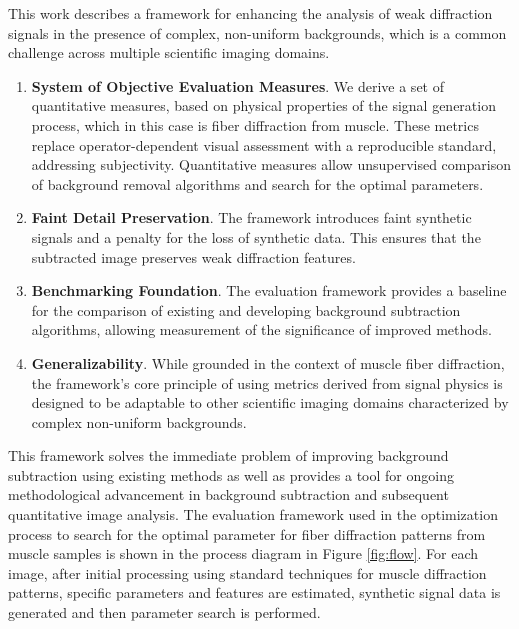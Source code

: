 \documentclass[iucr,review]{iucrjournals}
\begin{document}
This work describes a framework for enhancing the analysis of weak diffraction signals in the presence of complex, non-uniform backgrounds, 
which is a common challenge across multiple scientific imaging domains. 
\begin{enumerate}
        \item \textbf{System of Objective Evaluation Measures}. We derive a set of quantitative measures,
        based on physical properties of the signal generation process, which in this case is fiber diffraction from muscle.
        These metrics replace operator-dependent visual assessment with a reproducible standard,
        addressing subjectivity.
        Quantitative measures allow unsupervised
        comparison of background removal algorithms and search for the optimal parameters. 
        \item \textbf{Faint Detail Preservation}. The framework introduces faint synthetic signals and a penalty for the loss
        of synthetic data. This ensures that the subtracted image preserves weak diffraction features.
        \item \textbf{Benchmarking Foundation}. The evaluation framework provides a baseline for the comparison
        of existing and developing background subtraction algorithms, allowing measurement of the significance of improved methods. 
        \item \textbf{Generalizability}. While grounded in the context of muscle fiber diffraction, the framework's
        core principle of using metrics derived from signal physics
        is designed to be adaptable to other scientific imaging domains characterized by complex non-uniform backgrounds. 
\end{enumerate}

This framework solves the immediate problem of improving background subtraction using existing methods as well as provides
a tool for ongoing methodological advancement in background subtraction and subsequent quantitative image analysis. 
The evaluation framework used in the optimization process to search for the optimal parameter
for fiber diffraction patterns from muscle samples is shown in the process diagram in Figure \ref{fig:flow}. 
For each image, after initial processing using standard techniques for muscle diffraction patterns,
specific parameters and features are estimated, synthetic signal data
is generated and then parameter search is performed. 
\end{document}
